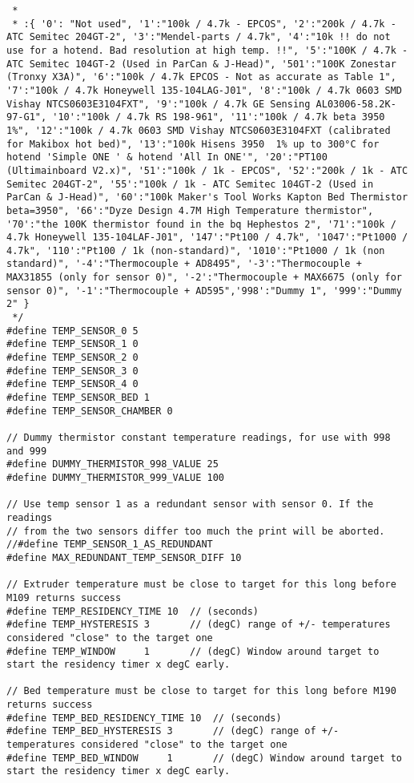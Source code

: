 \begin{lstlisting}
 *
 * :{ '0': "Not used", '1':"100k / 4.7k - EPCOS", '2':"200k / 4.7k - ATC Semitec 204GT-2", '3':"Mendel-parts / 4.7k", '4':"10k !! do not use for a hotend. Bad resolution at high temp. !!", '5':"100K / 4.7k - ATC Semitec 104GT-2 (Used in ParCan & J-Head)", '501':"100K Zonestar (Tronxy X3A)", '6':"100k / 4.7k EPCOS - Not as accurate as Table 1", '7':"100k / 4.7k Honeywell 135-104LAG-J01", '8':"100k / 4.7k 0603 SMD Vishay NTCS0603E3104FXT", '9':"100k / 4.7k GE Sensing AL03006-58.2K-97-G1", '10':"100k / 4.7k RS 198-961", '11':"100k / 4.7k beta 3950 1%", '12':"100k / 4.7k 0603 SMD Vishay NTCS0603E3104FXT (calibrated for Makibox hot bed)", '13':"100k Hisens 3950  1% up to 300°C for hotend 'Simple ONE ' & hotend 'All In ONE'", '20':"PT100 (Ultimainboard V2.x)", '51':"100k / 1k - EPCOS", '52':"200k / 1k - ATC Semitec 204GT-2", '55':"100k / 1k - ATC Semitec 104GT-2 (Used in ParCan & J-Head)", '60':"100k Maker's Tool Works Kapton Bed Thermistor beta=3950", '66':"Dyze Design 4.7M High Temperature thermistor", '70':"the 100K thermistor found in the bq Hephestos 2", '71':"100k / 4.7k Honeywell 135-104LAF-J01", '147':"Pt100 / 4.7k", '1047':"Pt1000 / 4.7k", '110':"Pt100 / 1k (non-standard)", '1010':"Pt1000 / 1k (non standard)", '-4':"Thermocouple + AD8495", '-3':"Thermocouple + MAX31855 (only for sensor 0)", '-2':"Thermocouple + MAX6675 (only for sensor 0)", '-1':"Thermocouple + AD595",'998':"Dummy 1", '999':"Dummy 2" }
 */
#define TEMP_SENSOR_0 5
#define TEMP_SENSOR_1 0
#define TEMP_SENSOR_2 0
#define TEMP_SENSOR_3 0
#define TEMP_SENSOR_4 0
#define TEMP_SENSOR_BED 1
#define TEMP_SENSOR_CHAMBER 0

// Dummy thermistor constant temperature readings, for use with 998 and 999
#define DUMMY_THERMISTOR_998_VALUE 25
#define DUMMY_THERMISTOR_999_VALUE 100

// Use temp sensor 1 as a redundant sensor with sensor 0. If the readings
// from the two sensors differ too much the print will be aborted.
//#define TEMP_SENSOR_1_AS_REDUNDANT
#define MAX_REDUNDANT_TEMP_SENSOR_DIFF 10

// Extruder temperature must be close to target for this long before M109 returns success
#define TEMP_RESIDENCY_TIME 10  // (seconds)
#define TEMP_HYSTERESIS 3       // (degC) range of +/- temperatures considered "close" to the target one
#define TEMP_WINDOW     1       // (degC) Window around target to start the residency timer x degC early.

// Bed temperature must be close to target for this long before M190 returns success
#define TEMP_BED_RESIDENCY_TIME 10  // (seconds)
#define TEMP_BED_HYSTERESIS 3       // (degC) range of +/- temperatures considered "close" to the target one
#define TEMP_BED_WINDOW     1       // (degC) Window around target to start the residency timer x degC early.


\end{lstlisting}
